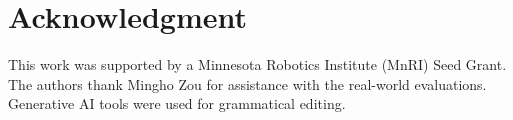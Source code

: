 \section*{Acknowledgment}
This work was supported by a Minnesota Robotics Institute (MnRI) Seed Grant. The authors thank Mingho Zou for assistance with the real-world evaluations. Generative AI tools were used for grammatical editing.
